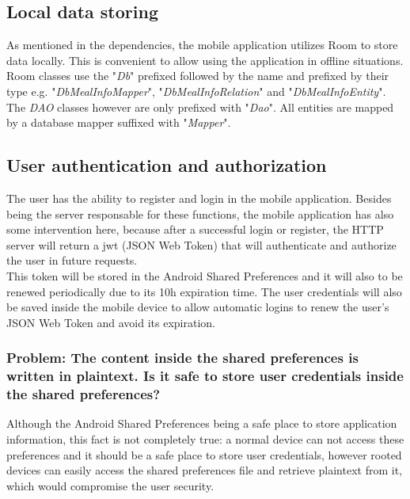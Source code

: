 \subsection{Local data storing}

As mentioned in the dependencies, the mobile application utilizes Room to store data locally. This is convenient
to allow using the application in offline situations.\\

Room classes use the "\textit{Db}" prefixed followed by the name and prefixed by their type e.g. "\textit{DbMealInfoMapper}", "\textit{DbMealInfoRelation}" and "\textit{DbMealInfoEntity}". 
The \textit{DAO} classes however are only prefixed with "\textit{Dao}". 
All entities are mapped by a database mapper suffixed with "\textit{Mapper}".

\subsection{User authentication and authorization}

The user has the ability to register and login in the mobile application. Besides being the server responsable for these functions, the mobile application has also some intervention
here, because after a successful login or register, the HTTP server will return a jwt (JSON Web Token) that will authenticate and authorize the user in future requests.\\

This token will be stored in the Android Shared Preferences\cite{sharedpreferences} and it will also to be renewed periodically due to its 10h expiration time. The user credentials will also be saved
inside the mobile device to allow automatic logins to renew the user's JSON Web Token and avoid its expiration.\\

\subsubsection{Problem: The content inside the shared preferences is written in plaintext. Is it safe to store user credentials inside the shared preferences?}

Although the Android Shared Preferences being a safe place to store application information, this fact is not completely true:
a normal device can not access these preferences and it should be a safe place to store user credentials, however rooted devices\cite{root} can easily
access the shared preferences file and retrieve plaintext from it, which would compromise the user security.\\

